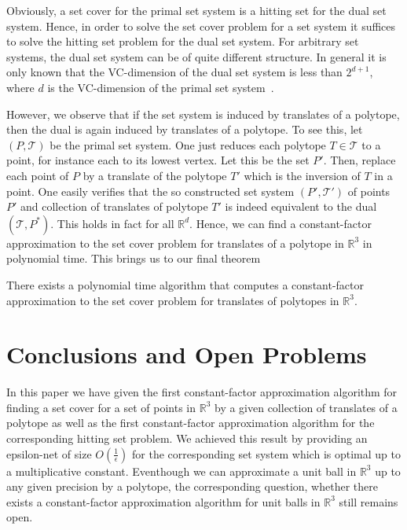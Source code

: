 \documentclass{stacs_proc}
\newcommand{\bigO}{O}
\newcommand{\setR}{\mathbb{R}}
\newcommand{\T}{\mathcal{T}}
\begin{document}
Obviously, a set cover for the primal set system is a hitting set for
the dual set system. Hence, in order to solve the set cover problem
for a set system it suffices to solve the hitting set problem for the
dual set system. For arbitrary set systems, the dual set system can be
of quite different structure. In general it is only known that the
VC-dimension of the dual set system is less than $2^{d+1}$, where $d$
is the VC-dimension of the primal set system~\cite{A83}.  

However, we observe that if the set system is induced by translates of
a polytope, then the dual is again induced by  translates of a
polytope. 
To see this, let $(P, \T)$ be the primal set system. One just reduces
each polytope $T\in \T$ to a point, for instance each to its lowest
vertex. Let this be the set $P'$. Then, replace each point of $P$ by a
translate of the polytope $T'$ which is the inversion of $T$ in a
point. One easily verifies that the so constructed set system $(P',
\T')$ of points $P'$ and collection of translates of polytope $T'$ is
indeed equivalent to the dual $(\T, P^*)$.      
This holds in fact for all $\setR^d$.    
Hence, we can find a constant-factor approximation to the set cover
problem for translates of a polytope in $\setR^3$ in polynomial time. 
This brings us to our final theorem
\begin{theorem}
  There exists a polynomial time algorithm that computes a
  constant-factor approximation to the set cover problem for
  translates of polytopes in $\setR^3$. 
\end{theorem} 


\vskip-0.3cm
\section{Conclusions and Open Problems}
In this paper we have given the first constant-factor approximation
algorithm for finding a set cover for a set of points in $\setR^3$ by a
given collection of  translates of a polytope as well as the first
constant-factor approximation algorithm for the corresponding hitting
set problem.  We achieved this result by providing an epsilon-net of
size $\bigO(\frac{1}{\epsilon})$ for the corresponding set system which is
optimal up to a multiplicative constant. 
Eventhough we can approximate a unit ball in $\setR^3$ up to any given
precision by a polytope, the corresponding question, whether there
exists a constant-factor approximation algorithm for unit balls in
$\setR^3$ still remains open.    
\end{document}
